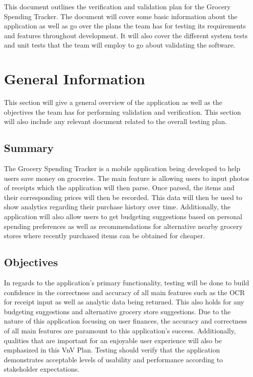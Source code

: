 \documentclass[12pt, titlepage]{article}
\begin{document}
\newpage


This document outlines the verification and validation plan for the Grocery Spending Tracker.
The document will cover some basic information about the application as well as go over the plans
the team has for testing its requirements and features throughout development. It will also cover
the different system tests and unit tests that the team will employ to go about validating
the software.

\section{General Information}

This section will give a general overview of the application as well as the objectives
the team has for performing validation and verification. This section will also include any
relevant document related to the overall testing plan.

\subsection{Summary}

The Grocery Spending Tracker is a mobile application being developed to help
users save money on groceries. The main feature is allowing users to input photos of receipts
which the application will then parse. Once parsed, the items and their corresponding prices will then be recorded.
This data will then be used to show analytics regarding their purchase history over time.
Additionally, the application will also allow users to get budgeting suggestions based on personal spending preferences
as well as recommendations for alternative nearby grocery stores where recently purchased items
can be obtained for cheaper.

\subsection{Objectives}

In regards to the application's primary functionality, testing will be done to build confidence
in the correctness and accuracy of all main features such as the OCR for receipt input as well as analytic
data being returned. This also holds for any budgeting suggestions and alternative grocery store suggestions.
Due to the nature of this application focusing on user finances, the accuracy and correctness of all
main features are paramount to this application's success.
Additionally, qualities that are important for an enjoyable user experience
will also be emphasized in this VnV Plan. Testing should verify that the application demonstrates
acceptable levels of usability and performance according to stakeholder expectations. \\
\end{document}
